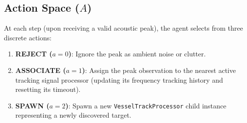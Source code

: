 \documentclass[12pt,a4paper]{article}
\begin{document}
\subsection{Action Space ($A$)}
At each step (upon receiving a valid acoustic peak), the agent selects from three discrete actions:
\begin{enumerate}
    \item \textbf{REJECT ($a = 0$)}: Ignore the peak as ambient noise or clutter.
    \item \textbf{ASSOCIATE ($a = 1$)}: Assign the peak observation to the nearest active tracking signal processor (updating its frequency tracking history and resetting its timeout).
    \item \textbf{SPAWN ($a = 2$)}: Spawn a new \texttt{VesselTrackProcessor} child instance representing a newly discovered target.
\end{enumerate}
\end{document}
